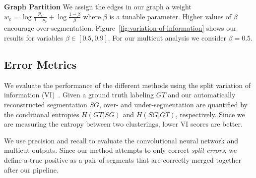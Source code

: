 \noindent\textbf{Graph Partition}
We assign the edges in our graph a weight $w_e = \log{\frac{p_e}{1 - p_e}} + \log{\frac{1 - \beta}{\beta}}$ where $\beta$ is a tunable parameter. 
Higher values of $\beta$ encourage over-segmentation.
Figure~\ref{fig:variation-of-information} shows our results for variables $\beta \in [0.5, 0.9]$. 
For our multicut analysis we consider $\beta = 0.5$. 

\subsection{Error Metrics}
\label{sec:variation-of-information}
We evaluate the performance of the different methods using the split variation of information (VI)~\cite{meila2003comparing}.
Given a ground truth labeling $GT$ and our automatically reconstructed segmentation $SG$, over- and under-segmentation are quantified by the conditional entropies $H(GT | SG)$ and $H(SG | GT)$, respectively. 
Since we are measuring the entropy between two clusterings, lower VI scores are better.

We use precision and recall to evaluate the convolutional neural network and multicut outputs. 
Since our method attempts to only correct \textit{split errors}, we define a true positive as a pair of segments that are correctly merged together after our pipeline.